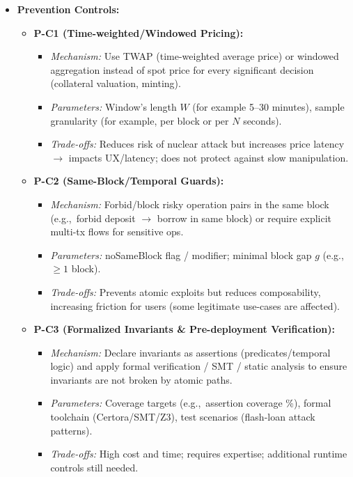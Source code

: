 \begin{itemize}
    \item \textbf{Prevention Controls:}
    \begin{itemize}
        \item \textbf{P-C1 (Time-weighted/Windowed Pricing):}
            \begin{itemize}
                \item \textit{Mechanism:} Use TWAP (time-weighted average price) or windowed aggregation instead of spot price for every significant decision (collateral valuation, minting). \cite{werner2022sok}
                \item \textit{Parameters:} Window's length $W$ (for example 5--30 minutes), sample granularity (for example, per block or per $N$ seconds).
                \item \textit{Trade-offs:} Reduces risk of nuclear attack but increases price latency $\rightarrow$ impacts UX/latency; does not protect against slow manipulation.
            \end{itemize}
        \item \textbf{P-C2 (Same-Block/Temporal Guards):}
            \begin{itemize}
                \item \textit{Mechanism:} Forbid/block risky operation pairs in the same block (e.g.,\ forbid deposit $\rightarrow$ borrow in same block) or require explicit multi-tx flows for sensitive ops.
                \item \textit{Parameters:} noSameBlock flag / modifier; minimal block gap $g$ (e.g.,\ $\geq 1$ block).
                \item \textit{Trade-offs:} Prevents atomic exploits but reduces composability, increasing friction for users (some legitimate use-cases are affected).
            \end{itemize}
        \item \textbf{P-C3 (Formalized Invariants \& Pre-deployment Verification):}
            \begin{itemize}
                \item \textit{Mechanism:} Declare invariants as assertions (predicates/temporal logic) and apply formal verification / SMT / static analysis to ensure invariants are not broken by atomic paths. \cite{alhaidari2025protecting, wu2024strengthening_defi}
                \item \textit{Parameters:} Coverage targets (e.g.,\ assertion coverage \%), formal toolchain (Certora/SMT/Z3), test scenarios (flash-loan attack patterns).
                \item \textit{Trade-offs:} High cost and time; requires expertise; additional runtime controls still needed.
            \end{itemize}
    \end{itemize}


\end{itemize}
